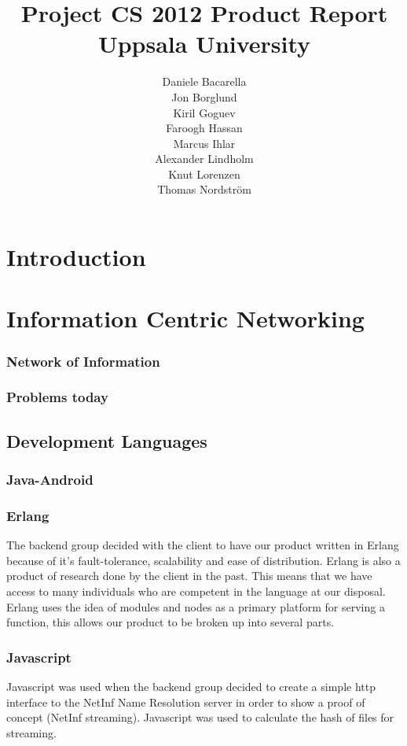 \documentclass[11pt]{report}
\title{Project CS 2012 Product Report\\Uppsala University\\}
\author{Daniele Bacarella\\
		Jon Borglund\\
		Kiril Goguev\\
		Faroogh Hassan\\
		Marcus Ihlar\\
		Alexander Lindholm\\
		Knut Lorenzen\\
		Thomas Nordstr\"om\\
}
\date{}
\begin{document}
\maketitle

\tableofcontents

\chapter{Introduction}
\chapter{Information Centric Networking}

\subsection{Network of Information}
\subsection{Problems  today}
\section{Development Languages}
\subsection{Java-Android}
\subsection{Erlang}
The backend group decided with the client to have our product written in Erlang because of it's fault-tolerance, scalability and ease of distribution. Erlang is also a product of research done by the client in the past. This means that we have access to many individuals who are competent in the language at our disposal.
Erlang uses the idea of modules and nodes as a primary platform for serving a function, this allows our product to be broken up into several parts.
 
\subsection{Javascript}

Javascript was used when the backend group decided to create a simple http interface to the NetInf Name Resolution server in order to show a proof of concept (NetInf streaming). Javascript was used to calculate the hash of files for streaming.
\end{document}
